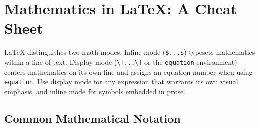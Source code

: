 \section{Mathematics in \LaTeX{}: A Cheat Sheet}
\label{sec:latex-math}

\LaTeX{} distinguishes two math modes. Inline mode (\verb|$...$|)
typesets mathematics within a line of text. Display mode
(\verb|\[...\]| or the \texttt{equation} environment) centers
mathematics on its own line and assigns an equation number when using
\texttt{equation}. Use display mode for any expression that warrants
its own visual emphasis, and inline mode for symbols embedded in
prose.

\subsection{Common Mathematical Notation}

